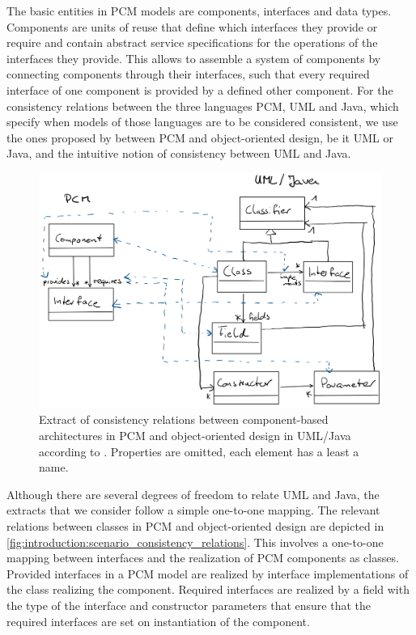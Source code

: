 The basic entities in \gls{PCM} models are components, interfaces and data types.
Components are units of reuse that define which interfaces they provide or require and contain abstract service specifications for the operations of the interfaces they provide.
This allows to assemble a system of components by connecting components through their interfaces, such that every required interface of one component is provided by a defined other component.
For the consistency relations between the three languages \gls{PCM}, \gls{UML} and Java, which specify when models of those languages are to be considered consistent, we use the ones proposed by \textcite{langhammer2017a} between \gls{PCM} and object-oriented design, be it \gls{UML} or Java, and the intuitive notion of consistency between \gls{UML} and Java.

\begin{figure}
    \centering
    \includegraphics[width=\textwidth]{figures/prologue/introduction/scenario_consistency_relations.png}
    \caption[Consistency relation for PCM and UML/Java]{Extract of consistency relations between component-based architectures in \gls{PCM} and object-oriented design in \gls{UML}/Java according to \cite{langhammer2017a}. Properties are omitted, each element has a least a name.}
    \label{fig:introduction:scenario_consistency_relations}
\end{figure}

Although there are several degrees of freedom to relate \gls{UML} and Java, the extracts that we consider follow a simple one-to-one mapping.
The relevant relations between classes in \gls{PCM} and object-oriented design are depicted in \autoref{fig:introduction:scenario_consistency_relations}.
This involves a one-to-one mapping between interfaces and the realization of \gls{PCM} components as classes. 
Provided interfaces in a \gls{PCM} model are realized by interface implementations of the class realizing the component. 
Required interfaces are realized by a field with the type of the interface and constructor parameters that ensure that the required interfaces are set on instantiation of the component.

